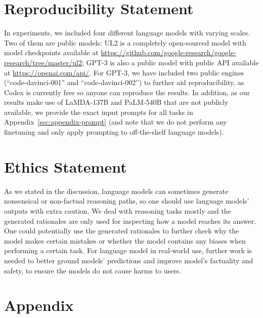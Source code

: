 \documentclass{article} %
\begin{document}
\section*{Reproducibility Statement}
In experiments, we included four different language models with varying scales. Two of them are public models: UL2 is a completely open-sourced model with model checkpoints available at \url{https://github.com/google-research/google-research/tree/master/ul2}; 
GPT-3 is also a public model with public API available at \url{https://openai.com/api/}. 
For GPT-3, we have included two public engines (``code-davinci-001'' and ``code-davinci-002'') to further aid reproducibility, as Codex is currently free so anyone can reproduce the results.
In addition, as our results make use of LaMDA-137B and PaLM-540B that are not publicly available, we provide the exact input prompts for all tasks in Appendix~\ref{sec:appendix-prompt} (and note that we do not perform any finetuning and only apply prompting to off-the-shelf language models). 

\section*{Ethics Statement}
As we stated in the discussion, language models can sometimes generate nonsensical or non-factual reasoning paths, so one should use language models' outputs with extra caution. 
We deal with reasoning tasks mostly and the generated rationales are only used for inspecting how a model reaches its answer. One could potentially use the generated rationales to further check why the model makes certain mistakes or whether the model contains any biases when performing a certain task.
For language model in real-world use, further work is needed to better ground models' predictions and improve model's factuality and safety, to ensure the models do not cause harms to users.




\clearpage
\appendix
\section{Appendix}


\end{document}
